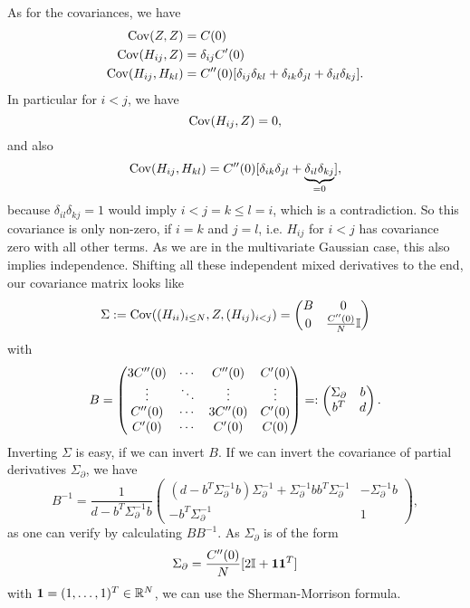 As for the covariances, we have 
\begin{align*}
	\operatorname{Cov}(Z,Z) &= C(0)\\
	\operatorname{Cov}(H_{ij}, Z) &= \delta_{ij} C'(0)\\
	\operatorname{Cov}(H_{ij}, H_{kl}) &= C''(0)
	[\delta_{ij}\delta_{kl} + \delta_{ik}\delta_{jl} + \delta_{il}\delta_{kj}].
\end{align*}
In particular for \(i<j\), we have
\[
	\operatorname{Cov}(H_{ij}, Z) = 0,
\]
and also
\[
	\operatorname{Cov}(H_{ij}, H_{kl}) = C''(0)
	[\delta_{ik}\delta_{jl} + \underbrace{\delta_{il}\delta_{kj}}_{=0}],
\]
because \(\delta_{il}\delta_{kj}=1\) would imply \(i < j = k \le l = i\), which
is a contradiction. So this covariance is only non-zero, if \(i=k\) and \(j=l\),
i.e. \(H_{ij}\) for \(i<j\) has covariance zero with all other terms.
As we are in the multivariate Gaussian case, this also implies independence.
Shifting all these independent mixed derivatives to the end, our covariance
matrix looks like
\[
	\Sigma := \operatorname{Cov}((H_{ii})_{i\le N}, Z, (H_{ij})_{i<j})
	= \begin{pmatrix}
		B & 0\\
		0 & \frac{C''(0)}{N}\mathbb{I}
	\end{pmatrix}
\]
with
\[
	B = \begin{pmatrix}
		3C''(0) &  \cdots & C''(0)
		& C'(0) \\
		\vdots & \ddots &\vdots & \vdots \\
		C''(0) & \cdots &  3 C''(0) & C'(0)\\
		C'(0)	& \cdots & C'(0) & C(0)
	\end{pmatrix}
	=: \begin{pmatrix}
		\Sigma_\partial & b \\
		b^T & d
	\end{pmatrix}.
\]
Inverting \(\Sigma\) is easy, if we can invert \(B\). If we can invert the
covariance of partial derivatives \(\Sigma_\partial\), we have
\[
	B^{-1} = \frac1{d- b^T \Sigma_\partial^{-1}b}\begin{pmatrix}
		( d- b^T \Sigma_\partial^{-1}b )\Sigma_\partial^{-1}
		+ \Sigma_\partial^{-1}b b^T \Sigma_\partial^{-1}
		& -\Sigma_\partial^{-1} b\\
		-b^T\Sigma_\partial ^{-1} &  1
	\end{pmatrix},
\]
as one can verify by calculating \(BB^{-1}\). As \(\Sigma_\partial\) is of the form
\[
	\Sigma_\partial=\frac{C''(0)}{N}[2\mathbb{I} + \mathbf{1}\mathbf{1}^T]
\]
with \(\mathbf{1}=(1,\dots,1)^T\in\mathbb{R}^N\), we can use the Sherman-Morrison
formula.

